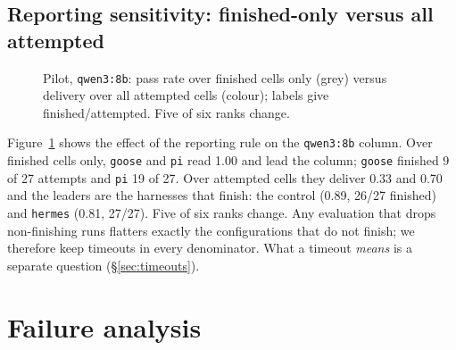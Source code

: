 \documentclass[10pt]{article}
\begin{document}
\subsection{Reporting sensitivity: finished-only versus all attempted}
\label{sec:sensitivity}

\begin{figure}[t]
\centering
\begin{minipage}[t]{0.6\linewidth}\centering\end{minipage}
\caption{Pilot, \texttt{qwen3:8b}: pass rate over finished cells only (grey) versus delivery over
all attempted cells (colour); labels give finished/attempted. Five of six ranks change.}
\label{fig:sens}
\end{figure}

Figure~\ref{fig:sens} shows the effect of the reporting rule on the \texttt{qwen3:8b} column. Over
finished cells only, \texttt{goose} and \texttt{pi} read 1.00 and lead the column; \texttt{goose}
finished 9 of 27 attempts and \texttt{pi} 19 of 27. Over attempted cells they deliver 0.33 and 0.70
and the leaders are the harnesses that finish: the control (0.89, 26/27 finished) and
\texttt{hermes} (0.81, 27/27). Five of six ranks change. Any evaluation that drops non-finishing
runs flatters exactly the configurations that do not finish; we therefore keep timeouts in every
denominator. What a timeout \emph{means} is a separate question (\S\ref{sec:timeouts}).

\section{Failure analysis}
\label{sec:failures}
\end{document}
